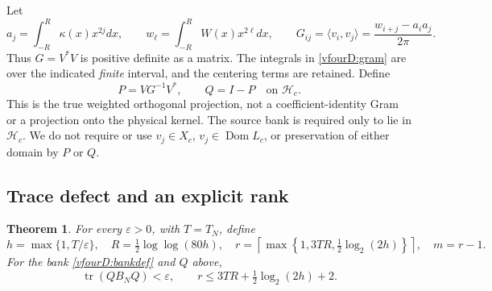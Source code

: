\documentclass[11pt,a4paper]{article}
\numberwithin{equation}{section}
\newtheorem{theorem}{Theorem}[section]
\theoremstyle{definition}\newtheorem{definition}[theorem]{Definition}
\theoremstyle{remark}\newtheorem{remark}[theorem]{Remark}
\newcommand{\Hh}{\mathcal H}\newcommand{\Hw}{\mathcal H}
\newcommand{\dom}{\operatorname{Dom}}\newcommand{\Var}{\operatorname{Var}}
\newcommand{\ip}[2]{\langle#1,#2\rangle}\newcommand{\norm}[1]{\lVert#1\rVert}\newcommand{\abs}[1]{\lvert#1\rvert}
\begin{document}
Let
\begin{equation}\label{vfourD:gram}
 a_j=\int_{-R}^{R}\kappa(x)x^{2j}dx,\qquad w_\ell=\int_{-R}^{R}W(x)x^{2\ell}dx,\qquad
 G_{ij}=\ip{v_i}{v_j}=\frac{w_{i+j}-a_i a_j}{2\pi}.
\end{equation}
Thus $G=V^*V$ is positive definite as a matrix. The integrals in \eqref{vfourD:gram} are over the indicated \emph{finite} interval, and the centering terms are retained. Define
\[P=VG^{-1}V^*,\qquad Q=I-P\quad\text{on }\Hh_c.\]
This is the true weighted orthogonal projection, not a coefficient-identity Gram or a projection onto the physical kernel. The source bank is required only to lie in $\Hh_c$. We do not require or use $v_j\in X_c$, $v_j\in\dom L_c$, or preservation of either domain by $P$ or $Q$.

\subsection{Trace defect and an explicit rank}\label{vfourD:compression}
\begin{theorem}\label{vfourD:defect}
For every $\varepsilon>0$, with $T=T_N$, define
\begin{equation}\label{vfourD:parameters}
 h=\max\{1,T/\varepsilon\},\quad R=\tfrac12\log\log(80h),\quad
 r=\left\lceil\max\left\{1,3TR,\tfrac12\log_2(2h)\right\}\right\rceil,\quad m=r-1.
\end{equation}
For the bank \eqref{vfourD:bankdef} and $Q$ above,
\begin{equation}\label{vfourD:traceerror}
 \operatorname{tr}(QB_NQ)<\varepsilon,\qquad
 r\le3TR+\tfrac12\log_2(2h)+2.
\end{equation}
\end{theorem}
\end{document}
